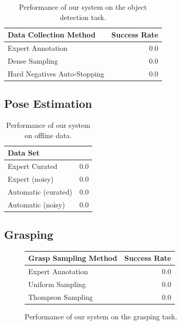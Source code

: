 \documentclass[conference]{IEEEtran}
\begin{document}
\begin{table}
  \begin{center}
  \caption{Performance of our system on the object detection task.}
  \begin{tabular}{lr}
    \toprule
  Data Collection Method & Success Rate \\ 
  \midrule
  Expert Annotation & 0.0 \\ 
  Dense Sampling & 0.0 \\ 
  Hard Negatives Auto-Stopping & 0.0 \\ 
  \bottomrule
  \end{tabular}
  \end{center}
\end{table}

\subsection{Pose Estimation}

\begin{table}
  \caption{Performance of our system on offline data.}
  \begin{center}
  \begin{tabular}{lr}
\toprule
  Data Set            &  \\ 
\midrule
  Expert Curated      & 0.0 \\ 
  Expert (noisy)      & 0.0 \\ 
  Automatic (curated) & 0.0 \\ 
  Automatic (noisy)   & 0.0\\
\bottomrule
  \end{tabular}

  \end{center}
\end{table}


\subsection{Grasping}

\begin{figure}
  \begin{center}
  \begin{tabular}{lr}
  \toprule
  Grasp Sampling Method & Success Rate \\ 
  \midrule
  Expert Annotation & 0.0 \\ 
  Uniform Sampling & 0.0 \\ 
  Thompson Sampling & 0.0 \\
  \bottomrule
  \end{tabular}
  \caption{Performance of our system on the grasping task.}
  \end{center}
\end{figure}
\end{document}
